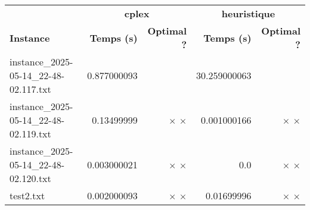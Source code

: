 \documentclass{article}
\begin{document}
\begin{center}
\renewcommand{\arraystretch}{1.4} 
 \begin{tabular}{lrrrr}
	\hline
 & \multicolumn{2}{c}{\textbf{cplex}} & \multicolumn{2}{c}{\textbf{heuristique}}\\
\textbf{Instance}  & \textbf{Temps (s)} & \textbf{Optimal ?}  & \textbf{Temps (s)} & \textbf{Optimal ?} \\\hline

instance\_2025-05-14\_22-48-02.117.txt & 0.877000093 & 
 & 30.259000063 & 
\\
instance\_2025-05-14\_22-48-02.119.txt & 0.13499999 & 
$\times$
$\times$
 & 0.001000166 & 
$\times$
$\times$
\\
instance\_2025-05-14\_22-48-02.120.txt & 0.003000021 & 
$\times$
$\times$
 & 0.0 & 
$\times$
$\times$
\\
test2.txt & 0.002000093 & 
$\times$
$\times$
 & 0.01699996 & 
$\times$
$\times$
\\
\hline\end{tabular}
\end{center}
\end{document}
